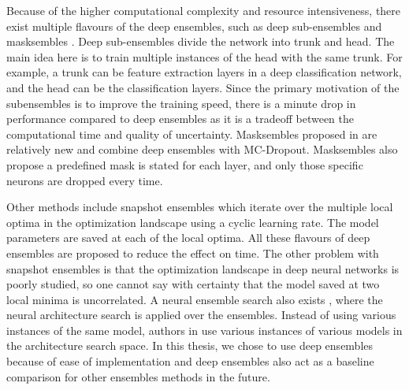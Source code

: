     Because of the higher computational complexity and resource intensiveness, there exist multiple flavours of the deep ensembles, such as deep sub-ensembles \cite{deep_subensembles} and masksembles \cite{masksembles}.
    Deep sub-ensembles divide the network into trunk and head.
    The main idea here is to train multiple instances of the head with the same trunk. For example, a trunk can be feature extraction layers in a deep classification network, and the head can be the classification layers.
    Since the primary motivation of the subensembles is to improve the training speed, there is a minute drop in performance compared to deep ensembles as it is a tradeoff between the computational time and quality of uncertainty.
    Masksembles proposed in \cite{masksembles} are relatively new and combine deep ensembles with MC-Dropout.
    Masksembles also propose a predefined mask is stated for each layer, and only those specific neurons are dropped every time.

    Other methods include snapshot ensembles \cite{snapshot_ensembles} which iterate over the multiple local optima in the optimization landscape using a cyclic learning rate. 
    The model parameters are saved at each of the local optima. 
    All these flavours of deep ensembles are proposed to reduce the effect on time.
    The other problem with snapshot ensembles is that the optimization landscape in deep neural networks is poorly studied, so one cannot say with certainty that the model saved at two local minima is uncorrelated.
    A neural ensemble search also exists \cite{NAS_Ensembles}, where the neural architecture search is applied over the ensembles.
    Instead of using various instances of the same model, authors in \cite{NAS_Ensembles} use various instances of various models in the architecture search space.
    In this thesis, we chose to use deep ensembles because of ease of implementation and deep ensembles also act as a baseline comparison for other ensembles methods in the future.

